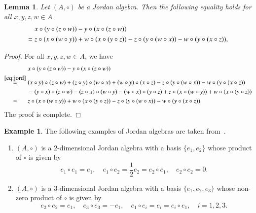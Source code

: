 \documentclass[12pt, reqno, a4paper]{amsart}
\newtheorem{lemma}[theorem]{Lemma}
\theoremstyle{definition}
\newtheorem{example}[theorem]{Example}
\begin{document}
\begin{lemma}
	Let $(A, \circ)$ be a Jordan algebra.
	Then the following equality holds for all $x, y, z, w \in A$
	\begin{align}
		& x \circ ( y\circ (z \circ w))-y \circ ( x\circ (z \circ w)) \notag \\
		=\; & z \circ ( x\circ (w \circ y)) +w \circ ( x\circ (y \circ z))- z \circ ( y\circ (w \circ x)) -w \circ ( y \circ (x \circ z)), \label{ID:jord2}
	\end{align}
\end{lemma}
\begin{proof}
	For all $x, y, z, w \in A$, we have
	\begin{align*}
		& x \circ ( y\circ (z \circ w)) - y \circ ( x\circ (z \circ w)) \\
		\overset{\eqref{eq:jord}}{=}\; & (x \circ y) \circ (z \circ w) + (z \circ y) \circ (w \circ x) + (w \circ y) \circ (x \circ z) - z \circ ( y\circ (w \circ x)) - w \circ ( y\circ (x \circ z)) \\
		& - (y \circ x) \circ (z \circ w) - (z \circ x) \circ (w \circ y) - (w \circ x) \circ (y \circ z) + z \circ ( x\circ (w \circ y)) + w \circ ( x\circ (y \circ z)) \\
		\overset{\hphantom{\eqref{eq:jord}}}{=}\; & z \circ ( x\circ (w \circ y)) +w \circ ( x\circ (y \circ z)) - z \circ ( y\circ (w \circ x)) -w \circ ( y\circ (x \circ z)).
	\end{align*}
	The proof is complete.
\end{proof}


\begin{example}\label{ex:JordanXY}
	The following examples of Jordan algebras are taken from~\cite{kashuba2016variety}.
	\begin{enumerate}
		\item[(a)]
		    $(A, \circ)$ is a 2-dimensional Jordan algebra with a basis $\{e_{1}, e_{2}\}$ whose product of $\circ$ is given by
		    \begin{equation*}
			    e_{1} \circ e_{1} = e_{1}, \quad
			    e_{1} \circ e_{2} = \frac{1}{2}e_{2} = e_{2} \circ e_{1}, \quad
			    e_{2} \circ e_{2} = 0. 
		    \end{equation*}

		\item[(b)]
		    $(A, \circ)$ is a 3-dimensional Jordan algebra with a basis $\{e_{1}, e_{2}, e_{3}\}$ whose non-zero product of $\circ$ is given by
		    \begin{equation*}
			    e_{2} \circ e_{2} = e_{1}, \quad
			    e_{3} \circ e_{3} = -e_{1}, \quad
			    e_{1} \circ e_{i} = e_{i} = e_{i} \circ e_{1}, \quad i=1,2,3. 
		    \end{equation*}
	\end{enumerate}
\end{example}
\end{document}
